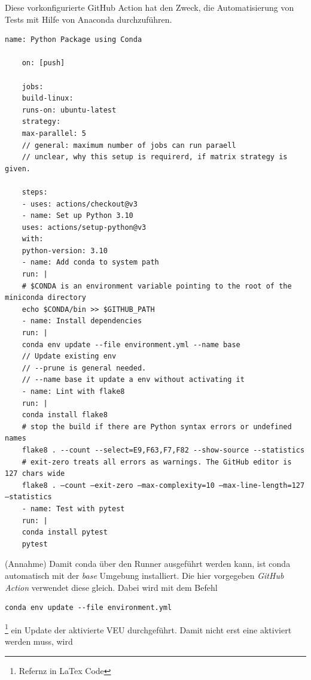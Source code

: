 
Diese vorkonfigurierte GitHub Action hat den Zweck, die Automatisierung von Tests mit Hilfe von Anaconda durchzuführen.

\begin{lstlisting}[style=Config, caption={GitHub Action Temple: Python Package create and test with conda}, captionpos=b]
	name: Python Package using Conda
	
	on: [push]
	
	jobs:
	build-linux:
	runs-on: ubuntu-latest
	strategy:
	max-parallel: 5
	// general: maximum number of jobs can run paraell
	// unclear, why this setup is requirerd, if matrix strategy is given.
	
	steps:
	- uses: actions/checkout@v3
	- name: Set up Python 3.10
	uses: actions/setup-python@v3
	with:
	python-version: 3.10
	- name: Add conda to system path
	run: |
	# $CONDA is an environment variable pointing to the root of the miniconda directory
	echo $CONDA/bin >> $GITHUB_PATH
	- name: Install dependencies
	run: |
	conda env update --file environment.yml --name base
	// Update existing env 
	// --prune is general needed.
	// --name base it update a env without activating it
	- name: Lint with flake8
	run: |
	conda install flake8
	# stop the build if there are Python syntax errors or undefined names
	flake8 . --count --select=E9,F63,F7,F82 --show-source --statistics
	# exit-zero treats all errors as warnings. The GitHub editor is 127 chars wide
	flake8 . —count —exit-zero —max-complexity=10 —max-line-length=127 —statistics
	- name: Test with pytest
	run: |
	conda install pytest
	pytest
\end{lstlisting}
(Annahme) Damit conda über den Runner ausgeführt werden kann,  ist conda automatisch mit der \textit{base} Umgebung installiert. Die hier vorgegeben \textit{GitHub Action} verwendet diese gleich. Dabei wird mit dem Befehl 
\begin{lstlisting}[style=CMD, caption={github default install dependencies}, captionpos=b]
	conda env update --file environment.yml
\end{lstlisting}\footnote{
	Refernz in LaTex Code %
}
ein Update der aktivierte \gls{VEU} durchgeführt. Damit nicht erst eine aktiviert werden muss, wird 

